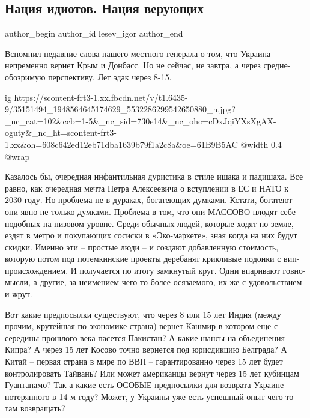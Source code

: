  
 
 
 
 
 
\subsection{Нация идиотов. Нация верующих}
\label{sec:12_06_2018.fb.lesev_igor.1.nacia_idiotov}
 
\ifcmt
 author_begin
   author_id lesev_igor
 author_end
\fi

Вспомнил недавние слова нашего местного генерала о том, что Украина непременно
вернет Крым и Донбасс. Но не сейчас, не завтра, а через средне-обозримую
перспективу. Лет эдак через 8-15.

\ifcmt
  ig https://scontent-frt3-1.xx.fbcdn.net/v/t1.6435-9/35151494_1948564645174629_5532286299542650880_n.jpg?_nc_cat=102&ccb=1-5&_nc_sid=730e14&_nc_ohc=cDxJqiYXsXgAX-oguty&_nc_ht=scontent-frt3-1.xx&oh=608c642ed12eb71dba1639b79f1a2c8a&oe=61B9B5AC
  @width 0.4
  @wrap 
\fi

Казалось бы, очередная инфантильная дуристика в стиле ишака и падишаха. Все
равно, как очередная мечта Петра Алексеевича о вступлении в ЕС и НАТО к 2030
году. Но проблема не в дураках, богатеющих думками. Кстати, богатеют они явно
не только думками. Проблема в том, что они МАССОВО плодят себе подобных на
низовом уровне. Среди обычных людей, которые ходят по земле, ездят в метро и
покупающих сосиски в «Эко-маркете», зная когда на них будут скидки. Именно эти
– простые люди – и создают добавленную стоимость, которую потом под
потемкинские проекты деребанят крикливые подонки с вип-происхождением. И
получается по итогу замкнутый круг. Одни впаривают говно-мысли, а другие, за
неимением чего-то более осязаемого, их же с удовольствием и жрут.

Вот какие предпосылки существуют, что через 8 или 15 лет Индия (между прочим,
крутейшая по экономике страна) вернет Кашмир в котором еще с середины прошлого
века пасется Пакистан? А какие шансы на объединения Кипра? А через 15 лет
Косово точно вернется под юрисдикцию Белграда? А Китай – первая страна в мире
по ВВП – гарантированно через 15 лет будет контролировать Тайвань? Или может
американцы вернут через 15 лет кубинцам Гуантанамо? Так а какие есть ОСОБЫЕ
предпосылки для возврата Украине потерянного в 14-м году? Может, у Украины уже
есть успешный опыт чего-то там возвращать?

